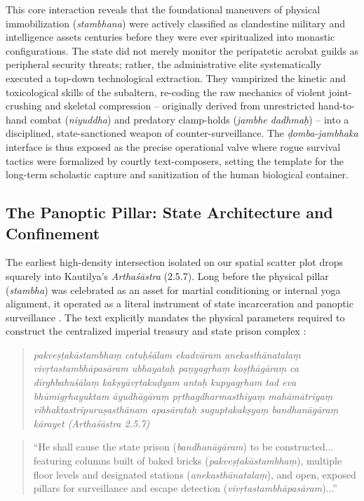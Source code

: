 \documentclass[11pt,twoside,letterpaper]{article}
\begin{document}
This core interaction reveals that the foundational maneuvers of physical immobilization (\textit{stambhana}) were actively classified as clandestine military and intelligence assets centuries before they were ever spiritualized into monastic configurations. The state did not merely monitor the peripatetic acrobat guilds as peripheral security threats; rather, the administrative elite systematically executed a top-down technological extraction. They vampirized the kinetic and toxicological skills of the subaltern, re-coding the raw mechanics of violent joint-crushing and skeletal compression -- originally derived from unrestricted hand-to-hand combat (\textit{niyuddha}) and predatory clamp-holds (\textit{jambhe dadhmaḥ}) -- into a disciplined, state-sanctioned weapon of counter-surveillance. The \textit{ḍomba-jambhaka} interface is thus exposed as the precise operational valve where rogue survival tactics were formalized by courtly text-composers, setting the template for the long-term scholastic capture and sanitization of the human biological container.

\subsection{The Panoptic Pillar: State Architecture and Confinement}

The earliest high-density intersection isolated on our spatial scatter plot drops squarely into Kautilya’s \textit{Arthaśāstra} (2.5.7). Long before the physical pillar (\textit{stambha}) was celebrated as an asset for martial conditioning or internal yoga alignment, it operated as a literal instrument of state incarceration and panoptic surveillance \cite{ArthaŚ}. The text explicitly mandates the physical parameters required to construct the centralized imperial treasury and state prison complex \cite{ArthaŚ}:
\begin{quote}
    \textit{pakveṣṭakāstambhaṃ catuḥśālam ekadvāram anekasthānatalaṃ vivṛtastambhāpasāram ubhayataḥ paṇyagṛhaṃ koṣṭhāgāraṃ ca dīrghbahuśālaṃ kakṣyāvṛtakuḍyam antaḥ kupyagṛham tad eva bhūmigṛhayuktam āyudhāgāraṃ pṛthagdharmasthīyaṃ mahāmātrīyaṃ} \\
    \textit{vibhaktastrīpuruṣasthānam apasārataḥ suguptakakṣyaṃ bandhanāgāraṃ kārayet (Arthaśāstra 2.5.7)}
\end{quote}

\begin{quote}    
    ``He shall cause the state prison (\textit{bandhanāgāram}) to be constructed... featuring columns built of baked bricks (\textit{pakveṣṭakāstambhaṃ}), multiple floor levels and designated stations (\textit{anekasthānatalaṃ}), and open, exposed pillars for surveillance and escape detection (\textit{vivṛtastambhāpasāram})...''
\end{quote}
\end{document}
